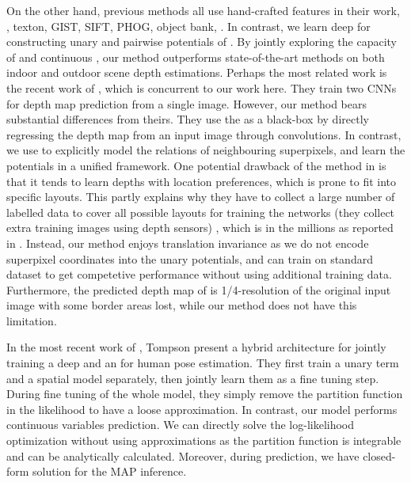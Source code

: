  
On the other hand, previous methods \cite{make3d_pami09,Liu_cvpr12,depthTransfer_pami14,Miaomiao_cvpr14,Ladicky_cvpr14} all use hand-crafted features in their work, \eg, texton, GIST, SIFT, PHOG, object bank, \etc.  
In contrast, we learn deep \cnn for constructing unary and pairwise potentials of \crf.
By jointly exploring the capacity  of \cnn and continuous \crf, our method outperforms state-of-the-art methods on both indoor and outdoor scene depth estimations. 
Perhaps the most related work 
%
is the recent work of \cite{dcnn_nips14}, which is concurrent to our work here. They train two CNNs for depth map prediction from a single image. 
%
%
However, our method bears substantial differences from theirs.
%
They use the \cnn as a black-box by directly regressing the depth map from an input image through convolutions. 
In contrast, we use \crf to explicitly model the relations of neighbouring superpixels, and learn the potentials in a unified \cnn framework. 
%
One potential drawback of the method in \cite{dcnn_nips14} is that it tends to learn depths with location preferences, which is prone to fit into specific layouts. 
This partly explains why they have to collect a large number of labelled data to cover all possible layouts for training the networks 
%
(they collect extra training images using depth sensors)
 , which is in the millions as reported in \cite{dcnn_nips14}.
Instead,  our method enjoys translation invariance as 
%
we do not encode superpixel coordinates into the unary potentials, 
and can train on standard dataset to get competetive performance without using additional training data. 
%
%
%
Furthermore, the predicted depth map of \cite{dcnn_nips14} is 1/4-resolution of the original input image with some border areas lost, 
%
while our method does not have this limitation.

In the most recent work of \cite{Lecun_nips14}, Tompson \etal present a hybrid architecture for jointly training a deep \cnn and an \mrf for human pose estimation. 
%
%
%
%
They first train a unary term and a spatial model separately, then jointly learn them as a fine tuning step.  
During fine tuning of the whole model, they simply remove the partition function in the likelihood to have a loose approximation.
In contrast, our model performs continuous variables prediction. 
We can directly solve the log-likelihood optimization without using approximations as the partition function is integrable and can be analytically calculated. 
Moreover, during prediction, we have closed-form solution for the MAP inference.